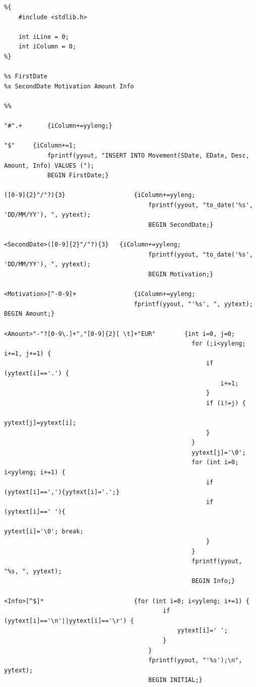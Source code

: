 \begin{lstlisting}
%{
    #include <stdlib.h>

    int iLine = 0;
    int iColumn = 0;
%}

%s FirstDate 
%x SecondDate Motivation Amount Info

%%

"#".+		{iColumn+=yyleng;}

"$"		{iColumn+=1; 
			fprintf(yyout, "INSERT INTO Movement(SDate, EDate, Desc, Amount, Info) VALUES (");
			BEGIN FirstDate;}

([0-9]{2}"/"?){3}					{iColumn+=yyleng; 
										fprintf(yyout, "to_date('%s', 'DD/MM/YY'), ", yytext); 
										BEGIN SecondDate;}

<SecondDate>([0-9]{2}"/"?){3}	{iColumn+=yyleng;
										fprintf(yyout, "to_date('%s', 'DD/MM/YY'), ", yytext); 
										BEGIN Motivation;}

<Motivation>[^-0-9]+                {iColumn+=yyleng;
                                    fprintf(yyout, "'%s', ", yytext); BEGIN Amount;}

<Amount>"-"?[0-9\.]+","[0-9]{2}[ \t]+"EUR"        {int i=0, j=0;
                                                    for (;i<yyleng; i+=1, j+=1) {
                                                        if (yytext[i]=='.') {
                                                            i+=1;
                                                        }
                                                        if (i!=j) {
                                                            yytext[j]=yytext[i];
                                                        }
                                                    }
                                                    yytext[j]='\0';
                                                    for (int i=0; i<yyleng; i+=1) {
                                                        if (yytext[i]==','){yytext[i]='.';}
                                                        if (yytext[i]==' '){
                                                            yytext[i]='\0'; break;
                                                        }
                                                    }
                                                    fprintf(yyout, "%s, ", yytext);
                                                    BEGIN Info;}

<Info>[^$]*                         {for (int i=0; i<yyleng; i+=1) {
                                            if (yytext[i]=='\n'||yytext[i]=='\r') {
                                                yytext[i]=' ';
                                            }
                                        }
                                        fprintf(yyout, "'%s');\n", yytext);
                                        BEGIN INITIAL;}


\end{lstlisting}
